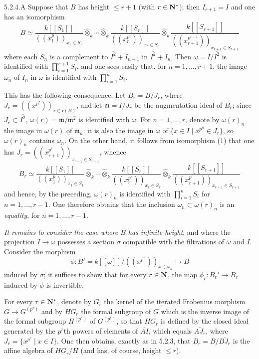 \begin{remark}{5.2.4.A}\label{VIIB.5.2.4.A}
Suppose that $B$ has height $\le r+1$ (with $r\in\mathbf{N}^*$); then $I_{r+1}=I$ and one has an isomorphism
\[
B\simeq\frac{k[[S_1]]}{((x_1^p))_{x_1\in S_1}}\widehat\otimes_k\cdots\widehat\otimes_k
\frac{k[[S_r]]}{((x_r^{p^r}))_{x_r\in S_r}}\widehat\otimes_k
\frac{k[[S_{r+1}]]}{((x_{r+1}^{p^{r+1}}))_{x_{r+1}\in S_{r+1}}}\tag{1}
\]
where each $S_n$ is a complement to $\overline{I^2}+I_{n-1}$ in $\overline{I^2}+I_n$. Then $\omega=I/\overline{I^2}$ is identified with $\prod_{i=1}^{r+1}S_i$, and one sees easily that, for $n=1,\ldots,r+1$, the image $\omega_n$ of $I_n$ in $\omega$ is identified with $\prod_{i=1}^n S_i$.

This has the following consequence. Let $B_r=B/J_r$, where $J_r=((x^{p^r}))_{x\in\mathfrak r(B)}$, and let $\mathfrak m=I/J_r$ be the augmentation ideal of $B_r$; since $J_r\subset\overline{I^2}$, $\omega(r)=\mathfrak m/\overline{\mathfrak m^2}$ is identified with $\omega$. For $n=1,\ldots,r$, denote by $\omega(r)_n$ the image in $\omega(r)$ of $\mathfrak m_n$; it is also the image in $\omega$ of $\{x\in I\mid x^{p^n}\in J_r\}$, so $\omega(r)_n$ contains $\omega_n$. On the other hand, it follows from isomorphism (1) that one has $J_r=((x_{r+1}^{p^r}))_{x_{r+1}\in S_{r+1}}$, whence
\[
B_r\simeq\frac{k[[S_1]]}{((x_1^p))_{x_1\in S_1}}\widehat\otimes_k\cdots\widehat\otimes_k
\frac{k[[S_r]]}{((x_r^{p^r}))_{x_r\in S_r}}\widehat\otimes_k
\frac{k[[S_{r+1}]]}{((x_{r+1}^{p^r}))_{x_{r+1}\in S_{r+1}}}\tag{2}
\]
and hence, by the preceding, $\omega(r)_n$ is identified with $\prod_{i=1}^n S_i$ for $n=1,\ldots,r-1$. One therefore obtains that the inclusion $\omega_n\subset\omega(r)_n$ is an \emph{equality}, for $n=1,\ldots,r-1$.
\end{remark}

\emph{It remains to consider the case where $B$ has infinite height}, and where the projection $I\to\omega$ possesses a section $\sigma$ compatible with the filtrations of $\omega$ and $I$. Consider the morphism
\[
\phi:B'=k[[\omega]]/((x^{p^n}))_{x\in\omega_n}\longrightarrow B
\]
induced by $\sigma$; it suffices to show that for every $r\in\mathbf{N}$, the map $\phi_r:B_r'\to B_r$ induced by $\phi$ is invertible.

For every $r\in\mathbf{N}^*$, denote by $G_r$ the kernel of the iterated Frobenius morphism $G\to G^{(p^r)}$ and by $HG_r$ the formal subgroup of $G$ which is the inverse image of the formal subgroup $H^{(p^r)}$ of $G^{(p^r)}$, so that $HG_r$ is defined by the closed ideal generated by the $p^r$th powers of elements of $\overline{AI}$, which equals $\overline{AJ_r}$, where $J_r=\{x^{p^r}\mid x\in I\}$. One then obtains, exactly as in 5.2.3, that $B_r=B/\overline{BJ_r}$ is the affine algebra of $HG_r/H$ (and has, of course, height $\le r$).

